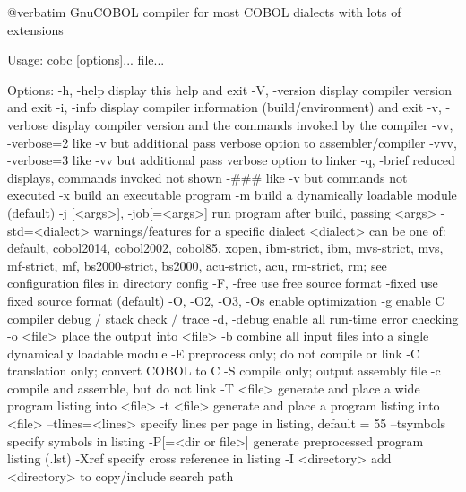 @verbatim
GnuCOBOL compiler for most COBOL dialects with lots of extensions

Usage: cobc [options]... file...

Options:
  -h, -help             display this help and exit
  -V, -version          display compiler version and exit
  -i, -info             display compiler information (build/environment)
                        and exit
  -v, -verbose          display compiler version and the commands
                        invoked by the compiler
  -vv, -verbose=2       like -v but additional pass verbose option
                        to assembler/compiler
  -vvv, -verbose=3      like -vv but additional pass verbose option
                        to linker
  -q, -brief            reduced displays, commands invoked not shown
  -###                  like -v but commands not executed
  -x                    build an executable program
  -m                    build a dynamically loadable module (default)
  -j [<args>], -job[=<args>]	run program after build, passing <args>
  -std=<dialect>        warnings/features for a specific dialect
                        <dialect> can be one of:
                        default, cobol2014, cobol2002, cobol85, xopen,
                        ibm-strict, ibm, mvs-strict, mvs,
                        mf-strict, mf, bs2000-strict, bs2000,
                        acu-strict, acu, rm-strict, rm;
                        see configuration files in directory config
  -F, -free             use free source format
  -fixed                use fixed source format (default)
  -O, -O2, -O3, -Os     enable optimization
  -g                    enable C compiler debug / stack check / trace
  -d, -debug            enable all run-time error checking
  -o <file>             place the output into <file>
  -b                    combine all input files into a single
                        dynamically loadable module
  -E                    preprocess only; do not compile or link
  -C                    translation only; convert COBOL to C
  -S                    compile only; output assembly file
  -c                    compile and assemble, but do not link
  -T <file>             generate and place a wide program listing into <file>
  -t <file>             generate and place a program listing into <file>
  --tlines=<lines>      specify lines per page in listing, default = 55
  --tsymbols            specify symbols in listing
  -P[=<dir or file>]    generate preprocessed program listing (.lst)
  -Xref                 specify cross reference in listing
  -I <directory>        add <directory> to copy/include search path
